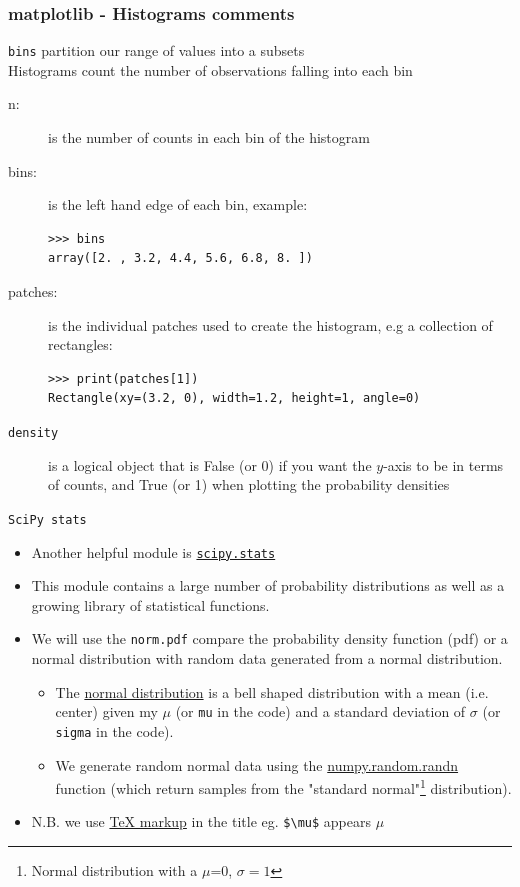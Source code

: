 \documentclass[xcolor=svgnames, handout]{beamer}
\newcommand{\nl}{\\[1em]}
\newcommand{\ft}[1]{\frametitle{#1}}
\begin{document}
\begin{frame}[fragile]\ft{matplotlib - Histograms comments}
{\tt bins} partition our range of values into a subsets\nl
Histograms count the number of observations falling into each bin
\begin{description}
\item[n:] is the number of counts in each bin of the histogram
\item [bins:] is the left hand edge of each bin, example:
\begin{Verbatim}[xleftmargin=0.1in]
>>> bins
array([2. , 3.2, 4.4, 5.6, 6.8, 8. ])
\end{Verbatim}

\item [patches:] is the individual patches used to create the histogram, e.g a collection of rectangles:
\begin{Verbatim}[xleftmargin=0.1in]
>>> print(patches[1])
Rectangle(xy=(3.2, 0), width=1.2, height=1, angle=0)
\end{Verbatim}
\item [{\tt density}] is a logical object that is False (or 0) if you want the $y$-axis to be in terms of counts, and True (or 1) when plotting the probability densities

\end{description}

\end{frame}





\begin{frame}[fragile]{\tt SciPy stats}
\begin{itemize}
\item Another helpful module is \href{https://docs.scipy.org/doc/scipy/reference/stats.html}{\tt scipy.stats}\nl
\item This module contains a large number of probability distributions as well as a growing library of statistical functions.\nl
\item We will use the {\tt norm.pdf} compare the probability density function (pdf) or a normal distribution with random data generated from a normal distribution.
\begin{itemize}
\item The \href{https://en.wikipedia.org/wiki/Normal_distribution}{normal distribution} is a bell shaped distribution with a mean (i.e. center) given my $\mu$ (or {\tt mu} in the code) and a standard deviation of $\sigma$ (or {\tt sigma} in the code).%
\item We generate random normal data using the \href{https://docs.scipy.org/doc/numpy/reference/generated/numpy.random.randn.html}{numpy.random.randn} function (which return samples from the "standard normal"\footnote{Normal distribution with a $\mu$=0, $\sigma=1$} distribution).\nl
\end{itemize}
\item N.B. we use  \href{https://matplotlib.org/users/mathtext.html}{TeX markup} in the title eg. \verb|$\mu$| appears $\mu$
\end{itemize}

\end{frame}
\end{document}
